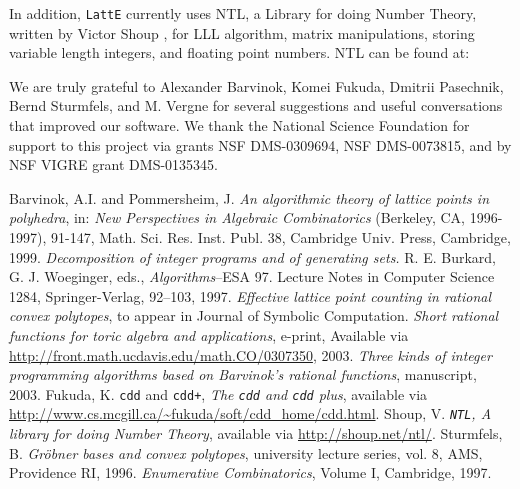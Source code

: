 \documentclass{article}
\begin{document}
In addition, {\tt LattE} currently uses NTL, a
Library for doing Number Theory, written by Victor Shoup \cite{shoup},
for LLL algorithm, matrix manipulations, storing variable length
integers, and floating point numbers.  NTL can be found at:


We are truly grateful to Alexander Barvinok, Komei Fukuda, Dmitrii
Pasechnik, Bernd Sturmfels, and M. Vergne for several suggestions and
useful conversations that improved our software.  We thank the National
Science Foundation for support to this project via grants NSF
DMS-0309694, NSF DMS-0073815, and by NSF VIGRE grant DMS-0135345.

\newpage

\begin{thebibliography}{99}

 {Barvinok, A.I. and Pommersheim, J.} {\em An
algorithmic theory of lattice points in polyhedra}, in: {\sl New
Perspectives in Algebraic Combinatorics} (Berkeley, CA, 1996-1997),
91-147, Math. Sci. Res.  Inst. Publ. 38, Cambridge Univ. Press,
Cambridge, 1999.
{\em Decomposition of integer programs and of generating sets.}  
R. E. Burkard, G. J. Woeginger, eds., {\em Algorithms}--ESA 97. 
Lecture Notes in Computer Science 1284, Springer-Verlag, 92--103, 1997. 
{\em Effective lattice point counting in rational convex polytopes},
to appear in Journal of Symbolic Computation.
 {\em Short rational functions for
toric algebra and applications}, e-print, Available via 
\url{http://front.math.ucdavis.edu/math.CO/0307350}, 2003.
 {\em Three kinds of integer programming algorithms based on
  {B}arvinok's rational functions}, manuscript, 2003.
 {Fukuda, K.} {\tt cdd} and {\tt cdd+}, {\em The {\tt cdd}
and {\tt cdd} plus}, available via
\url{http://www.cs.mcgill.ca/~fukuda/soft/cdd_home/cdd.html}.
 {Shoup, V.} {\em {\tt NTL}, A library for doing Number
Theory}, available via \url{http://shoup.net/ntl/}. 
 {Sturmfels, B.} {\em Gr\"obner bases and convex
polytopes}, university lecture series, vol. 8, AMS, Providence RI,
1996.
 {\em Enumerative Combinatorics}, 
Volume I, Cambridge, 1997.
\end{thebibliography}	
\end{document}
